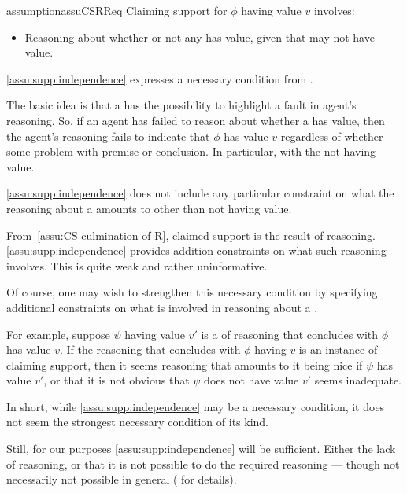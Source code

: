\begin{note}
  \begin{restatable}[\eiS{-} --- \eiS{}]{assumption}{assuCSRReq}
    \label{assu:supp:independence}
    Claiming support for \(\phi\) having value \(v\) involves:
    \begin{itemize}
    \item Reasoning about whether or not any \requ{} has value, given that \requ{} may not have value.
    \end{itemize}
    \vspace{-\baselineskip}
  \end{restatable}

  \autoref{assu:supp:independence} expresses a necessary condition from \ideaCSB{}.

  The basic idea is that a \requ{} has the possibility to highlight a fault in agent's reasoning.
  So, if an agent has failed to reason about whether a \requ{} has {\color{red} value}, then the agent's reasoning fails to indicate that \(\phi\) has value \(v\) regardless of whether {\color{red} some problem with premise or conclusion}.
  {\color{red} In particular, with the \requ{} not having value.}

  \autoref{assu:supp:independence} does not include any particular constraint on what the reasoning about a \requ{} amounts to {\color{red} other than \requ{} not having value.}
\end{note}

\begin{note}
  From~\autoref{assu:CS-culmination-of-R}, claimed support is the result of reasoning.
  \autoref{assu:supp:independence} provides addition constraints on what such reasoning involves.
  This is quite weak and rather uninformative.
\end{note}

\begin{note}[Strengthen?]
  Of course, one may wish to strengthen this necessary condition by specifying additional constraints on what is involved in reasoning about a \requ{}.

  For example, suppose \(\psi\) having value \(v'\) is a \requ{} of reasoning that concludes with \(\phi\) has value \(v\).
  If the reasoning that concludes with \(\phi\) having \(v\) is an instance of claiming support, then it seems reasoning that amounts to it being nice if \(\psi\) has value \(v'\), or that it is not obvious that \(\psi\) does not have value \(v'\) seems inadequate.

  In short, while \autoref{assu:supp:independence} may be a necessary condition, it does not seem the strongest necessary condition of its kind.

  Still, for our purposes \autoref{assu:supp:independence} will be sufficient.
  Either the lack of reasoning, or that it is not possible to do the required reasoning --- though not necessarily not possible in general (\nI{} for details).
\end{note}

